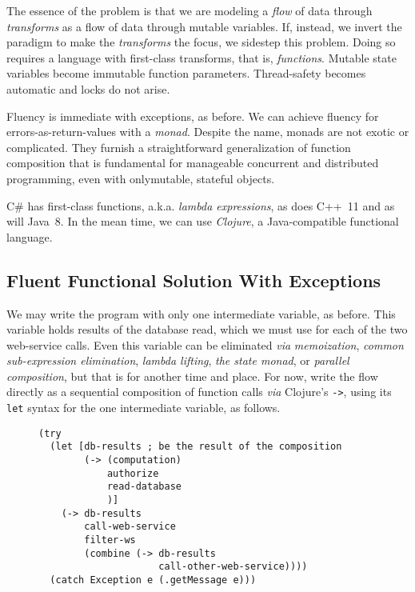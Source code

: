 \documentclass[11pt]{article}
\begin{document}
The essence of the problem is that we are modeling a \emph{flow} of data
through \emph{transforms} as a flow of data through mutable variables.
If, instead, we invert the paradigm to make the \emph{transforms} the
focus, we sidestep this problem. Doing so requires a language with
first-class transforms, that is, \emph{functions}. Mutable state
variables become immutable function parameters. Thread-safety
becomes automatic and locks do not arise.

Fluency is immediate with exceptions, as before. We can achieve
fluency for errors-as-return-values with a \emph{monad}. Despite the
name, monads are not exotic or complicated. They furnish a
straightforward generalization of function composition that is
fundamental for manageable concurrent and distributed programming,
even with onlymutable, stateful objects.

\mbox{C\#} has first-class functions, a.k.a. \emph{lambda expressions}, as
does \mbox{C++ 11} and as will \mbox{Java 8}. In the mean time, we
can use \emph{Clojure}, a Java-compatible functional language.

\subsection{Fluent Functional Solution With Exceptions}
\label{sec-3-1}

We may write the program with only one intermediate variable, as
before. This variable holds results of the database read, which we
must use for each of the two web-service calls. Even this variable
can be eliminated \emph{via} \emph{memoization}, \emph{common sub-expression
elimination}, \emph{lambda lifting}, \emph{the state monad}, or \emph{parallel
composition}, but that is for another time and place. For now,
write the flow directly as a sequential composition of
function calls \emph{via} Clojure's \verb|->|, using its \verb|let|
syntax for the one intermediate variable, as follows. 

\begin{figure}[H]
\label{functional-main-1}
\begin{verbatim}
(try
  (let [db-results ; be the result of the composition
        (-> (computation)
            authorize
            read-database
            )]
    (-> db-results 
        call-web-service
        filter-ws
        (combine (-> db-results
                     call-other-web-service))))
  (catch Exception e (.getMessage e)))
\end{verbatim}
\end{figure}
\end{document}
